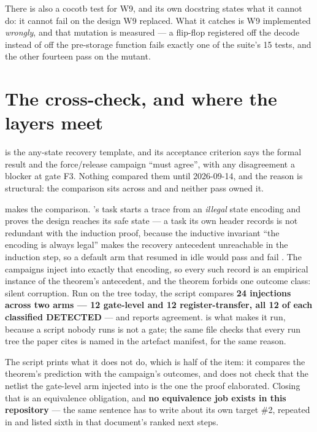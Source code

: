 There is also a cocotb test for W9, and its own docstring states what it
cannot do: it cannot fail on the design W9 replaced. What it catches is
W9 implemented \emph{wrongly}, and that mutation is measured --- a
flip-flop registered off the decode instead of off the pre-storage
function fails exactly one of the suite's 15 tests, and the other
fourteen pass on the mutant.

\section{The cross-check, and where the layers meet}
\label{sec:verif-cross}

 is the any-state recovery template, and its
acceptance criterion says the formal result and the force/release
campaign ``must agree'', with any disagreement a blocker at gate F3.
Nothing compared them until 2026-09-14, and the reason is structural: the
comparison sits across  and  and neither pass
owned it.

 makes the comparison.
's  task starts a trace from an
\emph{illegal} state encoding and proves the design reaches its safe
state --- a task its own header records is not redundant with the
induction proof, because the inductive invariant ``the encoding is always
legal'' makes the recovery antecedent unreachable in the induction step,
so a default arm that resumed in idle would pass  and fail
. The campaigns inject into exactly that encoding, so
every such record is an empirical instance of the theorem's antecedent,
and the theorem forbids one outcome class: silent corruption. Run on the
tree today, the script compares \textbf{24 injections across two arms ---
12 gate-level and 12 register-transfer, all 12 of each classified
DETECTED} --- and reports agreement. 
is what makes it run, because a script nobody runs is not a gate; the
same file checks that every run tree the paper cites is named in the
artefact manifest, for the same reason.

The script prints what it does not do, which is half of the item: it
compares the theorem's prediction with the campaign's outcomes, and does
not check that the netlist the gate-level arm injected into is the one
the proof elaborated. Closing that is an equivalence obligation, and
\textbf{no equivalence job exists in this repository} --- the same
sentence  has to write about its own target \#2,
repeated in  and listed sixth in that document's
ranked next steps.

